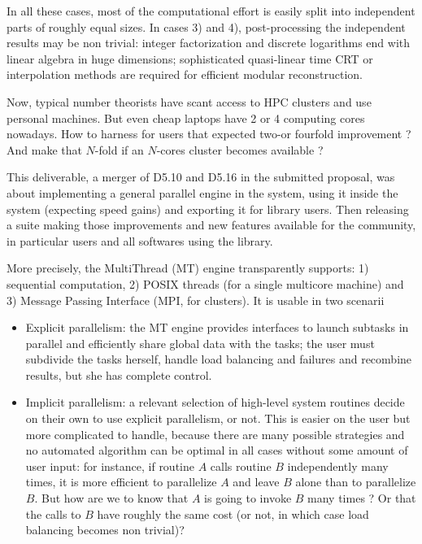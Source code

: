 \documentclass{deliverablereport}
\begin{document}
In all these cases, most of the computational effort is easily split into
independent parts of roughly equal sizes. In cases 3) and 4),
post-processing the independent results may be non trivial: integer
factorization and discrete logarithms end with linear algebra in huge
dimensions; sophisticated quasi-linear time CRT or interpolation methods are
required for efficient modular reconstruction.

Now, typical number theorists have scant access to HPC clusters and use
personal machines. But even cheap laptops have 2 or 4 computing cores
nowadays. How to harness for \PariGP users that expected two-or fourfold
improvement ? And make that $N$-fold if an $N$-cores cluster becomes
available ?

This deliverable, a merger of D5.10 and D5.16 in the submitted proposal, was
about implementing a general parallel engine in the \PariGP system, 
using it inside the system (expecting speed gains) and exporting it for
library users. Then releasing a \PariGP suite making those improvements
and new features available for the community, in particular \Sage
users and all softwares using the \Pari library.

More precisely, the MultiThread (MT) engine transparently supports: 1)
sequential computation, 2) POSIX threads (for a single multicore machine) and
3) Message Passing Interface (MPI, for clusters). It is usable in two
scenarii

\begin{itemize}
\item Explicit parallelism: the MT engine provides interfaces to launch
  subtasks in parallel and efficiently share global data with the tasks; the
  user must subdivide the tasks herself, handle load balancing and failures
  and recombine results, but she has complete control.

\item Implicit parallelism: a relevant selection of high-level system
  routines decide on their own to use explicit parallelism, or not. This is
  easier on the user but more complicated to handle, because there are many
  possible strategies and no automated algorithm can be optimal in all
  cases without some amount of user input: for instance, if routine $A$
  calls routine $B$ independently many times, it is more efficient to
  parallelize $A$ and leave $B$ alone than to parallelize $B$. But how are
  we to know that $A$ is going to invoke $B$ many times ? Or that the calls
  to $B$ have roughly the same cost (or not, in which case load balancing
  becomes non trivial)?
\end{itemize}
\end{document}
